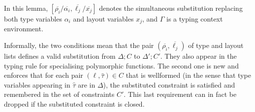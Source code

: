 
\noindent In this lemma,  $[\overline{\rho_i}/\overline{\alpha_i}, \overline{\ell_j}/\overline{x_j}]$ denotes the simultaneous
substitution replacing both type variables $\alpha_i$ and layout variables $x_j$,
and $\Gamma$ is a typing context environment.


Informally, the two conditions mean that the pair 
$(\overline{\rho_i}, \overline{\ell_j})$ of type and layout lists defines a valid 
substitution from $\Delta;C$ to $\Delta';C'$. %
They also appear in the typing rule for specialising polymorphic functions.
The second one is new and enforces that for each  pair
$(\ell, \hat{\tau})\in C$ that is wellformed (in the sense that type variables
appearing in $\hat{\tau}$ are in $\Delta$), 
the substituted constraint is satisfied and remembered in the set of constraints $C'$.
This last requirement can in fact be dropped if the substituted constraint is closed.




